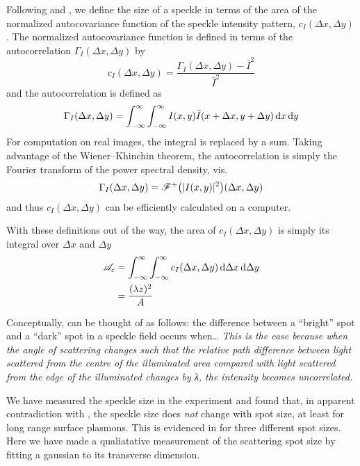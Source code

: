 Following  and , we define the size of a
speckle in terms of the area of the normalized
autocovariance function of the speckle intensity pattern, $c_I(\Delta x,
\Delta y)$.  The normalized autocovariance function is defined in terms of
the autocorrelation $\Gamma_I(\Delta x, \Delta y)$ by 
\begin{equation}
c_I(\Delta x, \Delta y) = \frac{\Gamma_I(\Delta x, \Delta y) - \bar{I}^2}{\bar{I}^2}
\end{equation}
and the autocorrelation is defined as
\begin{equation}
\Gamma_I(\Delta x, \Delta y) = \int_{-\infty}^{\infty}\int_{-\infty}^{\infty} I(x,y) \tilde{I}(x+\Delta x,y+\Delta y) \,\mathrm{d} x \,\mathrm{d} y
\end{equation}
For computation on real images, the integral is replaced by a sum.  Taking
advantage of the Wiener–Khinchin theorem, the autocorrelation is simply the
Fourier transform of the power spectral density, vis.
\begin{equation}
\Gamma_I(\Delta x, \Delta y) = {\mathscr{F}^{+}\bigl(|I(x,y)|^2\bigr)}(\Delta x, \Delta y)
\end{equation}
and thus  $c_I(\Delta x, \Delta y)$ can be efficiently calculated on a
computer.

With these definitions out of the way, the area of $c_I(\Delta x, \Delta
y)$ is simply its integral over $\Delta x$ and $\Delta y$
\begin{align}
\mathscr{A}_c &= \int_{-\infty}^{\infty}\int_{-\infty}^{\infty} c_I(\Delta x, \Delta y) \,\mathrm{d} \Delta x \,\mathrm{d} \Delta y\\
&=\frac{(\lambda z)^2}{A}
\label{eqn:spotsize}
\end{align}

Conceptually,  can be thought of as follows: the
difference between a ``bright'' spot and a ``dark'' spot in a speckle field
occurs when\ldots
\textit{This is the case because when the angle of scattering changes such
that the relative path difference between light scattered from the centre
of the illuminated area compared with light scattered from the edge of the
illuminated changes by λ, the intensity becomes uncorrelated.}

We have measured the speckle size in the experiment and found that, in
apparent contradiction with , the speckle size does
\textit{not} change with spot size, at least for long range surface
plasmons.  This is evidenced in  for three different
spot sizes.  Here we have made a qualiatative measurement of the scattering
spot size by fitting a gaussian to its transverse dimension.  
